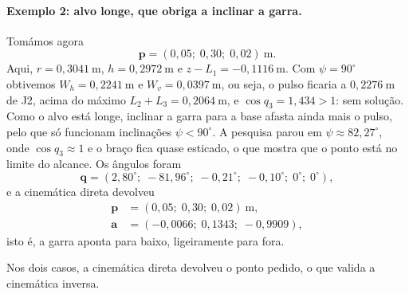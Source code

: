 \paragraph{Exemplo 2: alvo longe, que obriga a inclinar a garra.} Tomámos agora
\begin{equation*}
\mathbf{p}=(0{,}05;\;0{,}30;\;0{,}02)~\mathrm{m}.
\end{equation*}
Aqui, $r=0{,}3041~\mathrm{m}$, $h=0{,}2972~\mathrm{m}$ e $z-L_1=-0{,}1116~\mathrm{m}$. Com $\psi=90^\circ$ obtivemos $W_h=0{,}2241~\mathrm{m}$ e $W_v=0{,}0397~\mathrm{m}$, ou seja, o pulso ficaria a $0{,}2276~\mathrm{m}$ de J2, acima do máximo $L_2+L_3=0{,}2064~\mathrm{m}$, e $\cos q_3=1{,}434>1$: sem solução. Como o alvo está longe, inclinar a garra para a base afasta ainda mais o pulso, pelo que só funcionam inclinações $\psi<90^\circ$. A pesquisa parou em $\psi\approx82{,}27^\circ$, onde $\cos q_3\approx1$ e o braço fica quase esticado, o que mostra que o ponto está no limite do alcance. Os ângulos foram
\begin{equation*}
\mathbf{q}=(2{,}80^\circ;\;-81{,}96^\circ;\;-0{,}21^\circ;\;-0{,}10^\circ;\;0^\circ;\;0^\circ),
\end{equation*}
e a cinemática direta devolveu
\begin{align*}
\mathbf{p} &= (0{,}05;\;0{,}30;\;0{,}02)~\mathrm{m},\\
\mathbf{a} &= (-0{,}0066;\;0{,}1343;\;-0{,}9909),
\end{align*}
isto é, a garra aponta para baixo, ligeiramente para fora.

Nos dois casos, a cinemática direta devolveu o ponto pedido, o que valida a cinemática inversa.
